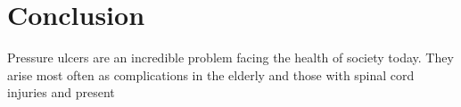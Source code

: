 \chapter{Conclusion}
\label{chap:conclusion}
	Pressure ulcers are an incredible problem facing the health of society today. They arise most often as complications in the elderly and those with spinal cord injuries \cite{allman95} and present 


